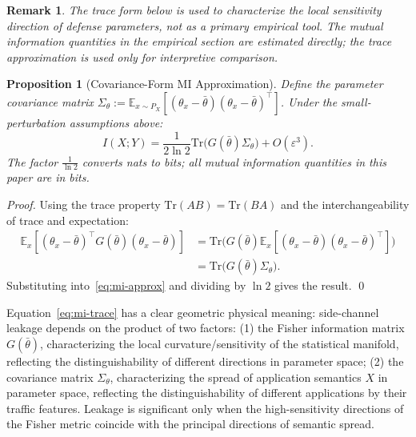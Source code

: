 \documentclass[lettersize,journal]{IEEEtran}
\newtheorem{proposition}{Proposition}
\newtheorem{remark}{Remark}
\newcommand{\E}{\mathbb{E}}
\begin{document}
\begin{remark}
The trace form below is used to characterize the local sensitivity
direction of defense parameters, not as a primary empirical tool.
The mutual information quantities in the empirical section are estimated
directly; the trace approximation is used only for interpretive comparison.
\end{remark}

\begin{proposition}[Covariance-Form MI Approximation]\label{prop:mi-cov}
Define the parameter covariance matrix
$\Sigma_\theta := \E_{x\sim P_X}[(\theta_x-\bar\theta)(\theta_x-\bar\theta)^\top]$.
Under the small-perturbation assumptions above:
\begin{equation}\label{eq:mi-trace}
I(X;Y) = \frac{1}{2\ln 2}\mathrm{Tr}\!\big(G(\bar\theta)\Sigma_\theta\big) + O(\varepsilon^3).
\end{equation}
The factor $\frac{1}{\ln 2}$ converts nats to bits; all mutual
information quantities in this paper are in bits.
\end{proposition}

\begin{proof}
Using the trace property $\mathrm{Tr}(AB) = \mathrm{Tr}(BA)$ and the
interchangeability of trace and expectation:
\begin{align*}
\E_x\!\left[(\theta_x-\bar\theta)^\top G(\bar\theta)(\theta_x-\bar\theta)\right]
  &= \mathrm{Tr}\!\big(G(\bar\theta)\E_x[(\theta_x-\bar\theta)(\theta_x-\bar\theta)^\top]\big)\\
  &= \mathrm{Tr}\!\big(G(\bar\theta)\Sigma_\theta\big).
\end{align*}
Substituting into~\eqref{eq:mi-approx} and dividing by $\ln 2$ gives the
result. \qed
\end{proof}

Equation~\eqref{eq:mi-trace} has a clear geometric physical meaning:
side-channel leakage depends on the product of two factors:
(1) the Fisher information matrix $G(\bar\theta)$, characterizing the local
curvature/sensitivity of the statistical manifold, reflecting the
distinguishability of different directions in parameter space;
(2) the covariance matrix $\Sigma_\theta$, characterizing the spread of
application semantics $X$ in parameter space, reflecting the distinguishability
of different applications by their traffic features.
Leakage is significant only when the high-sensitivity directions of the
Fisher metric coincide with the principal directions of semantic spread.
\end{document}
